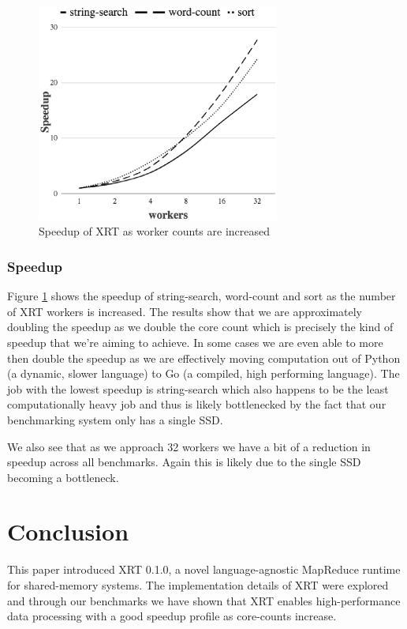 \documentclass[twocolumn,11px]{article}       %
\begin{document}
\begin{figure}[h]
  \centering
  \includegraphics[width=8cm]{graph.eps}
  \caption{Speedup of XRT as worker counts are increased}
  \label{fig:perf}
\end{figure}

\subsubsection{Speedup}

Figure \ref{fig:perf} shows the speedup of string-search, word-count and sort as the number of XRT workers is increased.
The results show that we are approximately doubling the speedup as we double the core count which is precisely the kind of speedup that we're aiming to achieve.
In some cases we are even able to more then double the speedup as we are effectively moving computation out of Python (a dynamic, slower language) to Go (a compiled, high performing language).
The job with the lowest speedup is string-search which also happens to be the least computationally heavy job and thus is likely bottlenecked by the fact that our benchmarking system only has a single SSD.

We also see that as we approach 32 workers we have a bit of a reduction in speedup across all benchmarks.
Again this is likely due to the single SSD becoming a bottleneck.

\section{Conclusion} \label{sec:concl}

This paper introduced XRT 0.1.0, a novel language-agnostic MapReduce runtime for shared-memory systems.
The implementation details of XRT were explored and through our benchmarks we have shown that XRT enables high-performance data processing with a good speedup profile as core-counts increase.
\end{document}
